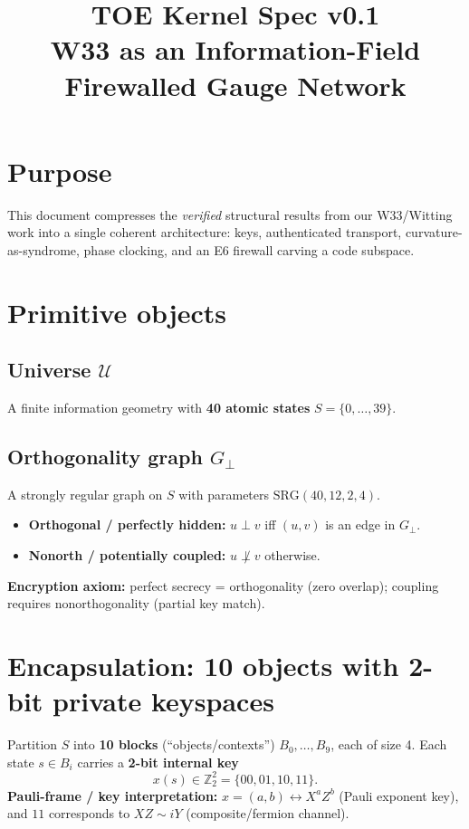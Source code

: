 \documentclass[11pt]{article}
\title{TOE Kernel Spec v0.1\\ W33 as an Information-Field Firewalled Gauge Network}
\author{}
\date{}
\begin{document}
\maketitle

\section*{Purpose}
This document compresses the \emph{verified} structural results from our W33/Witting work into a single coherent architecture: keys, authenticated transport, curvature-as-syndrome, phase clocking, and an E6 firewall carving a code subspace.

\section{Primitive objects}

\subsection{Universe $\mathcal{U}$}
A finite information geometry with \textbf{40 atomic states} $S=\{0,\dots,39\}$.

\subsection{Orthogonality graph $G_{\perp}$}
A strongly regular graph on $S$ with parameters $\mathrm{SRG}(40,12,2,4)$.
\begin{itemize}
  \item \textbf{Orthogonal / perfectly hidden:} $u\perp v$ iff $(u,v)$ is an edge in $G_{\perp}$.
  \item \textbf{Nonorth / potentially coupled:} $u\not\perp v$ otherwise.
\end{itemize}
\noindent\textbf{Encryption axiom:} perfect secrecy = orthogonality (zero overlap); coupling requires nonorthogonality (partial key match).

\section{Encapsulation: 10 objects with 2-bit private keyspaces}
Partition $S$ into \textbf{10 blocks} (“objects/contexts”) $B_0,\dots,B_9$, each of size 4.
Each state $s\in B_i$ carries a \textbf{2-bit internal key}
\[
x(s)\in \mathbb{Z}_2^2=\{00,01,10,11\}.
\]
\noindent\textbf{Pauli-frame / key interpretation:}
$x=(a,b)\leftrightarrow X^a Z^b$ (Pauli exponent key), and $11$ corresponds to $XZ\sim iY$ (composite/fermion channel).
\end{document}
